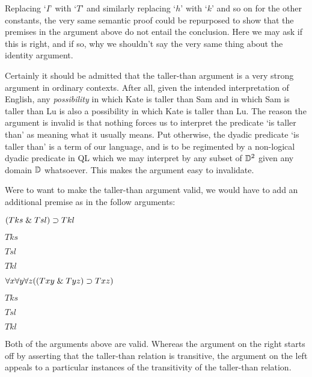 Replacing `$I$' with `$T$' and similarly replacing `$h$' with `$k$' and so on for the other constants, the very same semantic proof could be repurposed to show that the premises in the argument above do not entail the conclusion.
Here we may ask if this is right, and if so, why we shouldn't say the very same thing about the identity argument.

Certainly it should be admitted that the taller-than argument is a very strong argument in ordinary contexts.
After all, given the intended interpretation of English, any \textit{possibility} in which Kate is taller than Sam and in which Sam is taller than Lu is also a possibility in which Kate is taller than Lu. 
The reason the argument is invalid is that nothing forces us to interpret the predicate `is taller than' as meaning what it usually means.
Put otherwise, the dyadic predicate `is taller than' is a  term of our language, and is to be regimented by a non-logical dyadic predicate in QL which we may interpret by any subset of $\mathbb{D}^2$ given any domain $\mathbb{D}$ whatsoever. 
This makes the argument easy to invalidate.

Were to want to make the taller-than argument valid, we would have to add an additional premise as in the follow arguments:

\begin{multicols}{2}
  
\begin{earg}
  \item[] $(Tks \mathrel\& Tsl) \supset Tkl$
  \item[] $Tks$
  \item[] $Tsl$
  \item[\therefore] $Tkl$
\end{earg}

\begin{earg}
  \item[] $\forall x\forall y \forall z((Txy \mathrel\& Tyz) \supset Txz)$
  \item[] $Tks$
  \item[] $Tsl$
  \item[\therefore] $Tkl$
\end{earg}

\end{multicols}

Both of the arguments above are valid.
Whereas the argument on the right starts off by asserting that the taller-than relation is transitive, the argument on the left appeals to a particular instances of the transitivity of the taller-than relation.


